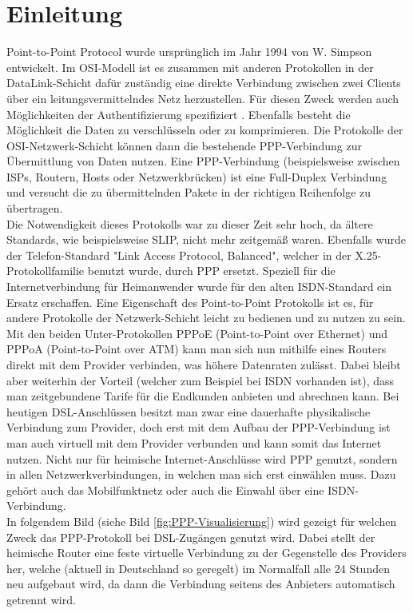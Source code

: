 \documentclass[journal]{IEEEtran}
\begin{document}
\section{Einleitung} 
 Point-to-Point Protocol wurde urspr\"unglich im Jahr 1994 von W. Simpson entwickelt. Im OSI-Modell ist es zusammen mit anderen Protokollen in der DataLink-Schicht daf\"ur zust\"andig eine direkte Verbindung zwischen zwei Clients \"uber ein leitungsvermittelndes Netz herzustellen. F\"ur diesen Zweck werden auch M\"oglichkeiten der Authentifizierung spezifiziert \cite{RFC1661}. Ebenfalls besteht die M\"oglichkeit die Daten zu verschl\"usseln oder zu komprimieren. Die Protokolle der OSI-Netzwerk-Schicht k\"onnen dann die bestehende PPP-Verbindung zur \"Ubermittlung von Daten nutzen. Eine PPP-Verbindung (beispielsweise zwischen ISPs, Routern, Hosts oder Netzwerkbr\"ucken) ist eine Full-Duplex Verbindung und versucht die zu \"ubermittelnden Pakete in der richtigen Reihenfolge zu \"ubertragen.\\
Die Notwendigkeit dieses Protokolls war zu dieser Zeit sehr hoch, da \"altere Standards, wie beispielsweise SLIP, nicht mehr zeitgem\"a\ss{} waren. Ebenfalls wurde der Telefon-Standard "Link Access Protocol, Balanced", welcher in der X.25-Protokollfamilie benutzt wurde, durch PPP ersetzt.  Speziell f\"ur die Internetverbindung f\"ur Heimanwender wurde f\"ur den alten ISDN-Standard ein Ersatz erschaffen. Eine Eigenschaft des Point-to-Point Protokolls ist es, f\"ur andere Protokolle der Netzwerk-Schicht leicht zu bedienen und zu nutzen zu sein. Mit den beiden Unter-Protokollen PPPoE (Point-to-Point over Ethernet)\cite{RFC2516} und PPPoA (Point-to-Point over ATM)\cite{RFC2364} kann man sich nun mithilfe eines Routers direkt mit dem Provider verbinden, was h\"ohere Datenraten zul\"asst. Dabei bleibt aber weiterhin der Vorteil (welcher zum Beispiel bei ISDN vorhanden ist), dass man zeitgebundene Tarife f\"ur die Endkunden anbieten und abrechnen kann. Bei heutigen DSL-Anschl\"ussen besitzt man zwar eine dauerhafte physikalische Verbindung zum Provider, doch erst mit dem Aufbau der PPP-Verbindung ist man auch virtuell mit dem Provider verbunden und kann somit das Internet nutzen. Nicht nur f\"ur heimische Internet-Anschl\"usse wird PPP genutzt, sondern in allen Netzwerkverbindungen, in welchen man sich erst einw\"ahlen muss. Dazu geh\"ort auch das Mobilfunktnetz oder auch die Einwahl \"uber eine ISDN-Verbindung.\\
In folgendem Bild (siehe Bild \ref{fig:PPP-Visualisierung}) wird gezeigt f\"ur welchen Zweck das PPP-Protokoll bei DSL-Zug\"angen genutzt wird. Dabei stellt der heimische Router eine feste virtuelle Verbindung zu der Gegenstelle des Providers her, welche (aktuell in Deutschland so geregelt) im Normalfall alle 24 Stunden neu aufgebaut wird, da dann die Verbindung seitens des Anbieters automatisch getrennt wird. \\
\end{document}
